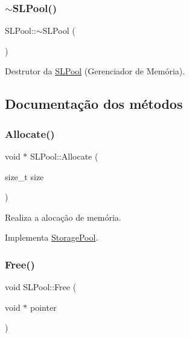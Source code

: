 \mbox{\label{classSLPool_aec8dd0c2fe10addb1786447f8ed62c20}} 
\subsubsection{\texorpdfstring{$\sim$\+S\+L\+Pool()}{~SLPool()}}
{\footnotesize\ttfamily S\+L\+Pool\+::$\sim$\+S\+L\+Pool (\begin{DoxyParamCaption}{ }\end{DoxyParamCaption})}



Destrutor da \hyperlink{classSLPool}{S\+L\+Pool} (Gerenciador de Memória). 



\subsection{Documentação dos métodos}
\mbox{\label{classSLPool_aaf054ceb8fa1b8e659f656f04a07dc84}} 
\subsubsection{\texorpdfstring{Allocate()}{Allocate()}}
{\footnotesize\ttfamily void $\ast$ S\+L\+Pool\+::\+Allocate (\begin{DoxyParamCaption}\item[{size\+\_\+t}]{size }\end{DoxyParamCaption})\hspace{0.3cm}{\ttfamily [virtual]}}



Realiza a alocação de memória. 



Implementa \hyperlink{classStoragePool_a123a07b2fff40000102b401d7d1b5d5a}{Storage\+Pool}.

\mbox{\label{classSLPool_aed31c75c4a2d56acd2f845dda2c5b1ad}} 
\subsubsection{\texorpdfstring{Free()}{Free()}}
{\footnotesize\ttfamily void S\+L\+Pool\+::\+Free (\begin{DoxyParamCaption}\item[{void $\ast$}]{pointer }\end{DoxyParamCaption})\hspace{0.3cm}{\ttfamily [virtual]}}



